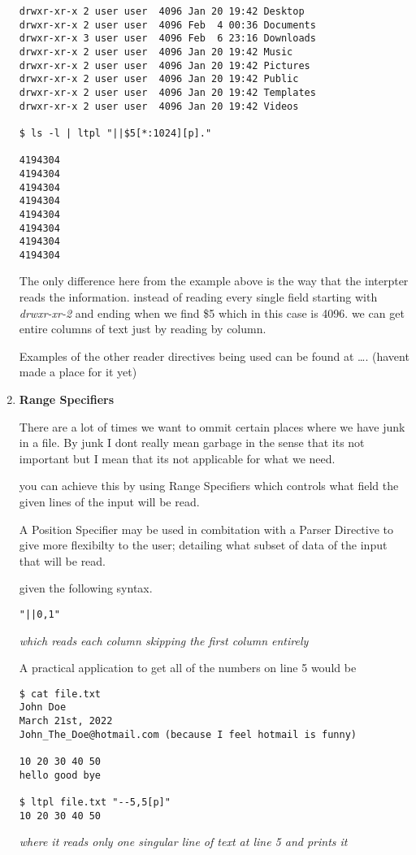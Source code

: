 \documentclass[11pt]{article}
\begin{document}
\begin{enumerate}
\begin{verbatim}
drwxr-xr-x 2 user user  4096 Jan 20 19:42 Desktop 
drwxr-xr-x 2 user user  4096 Feb  4 00:36 Documents
drwxr-xr-x 3 user user  4096 Feb  6 23:16 Downloads
drwxr-xr-x 2 user user  4096 Jan 20 19:42 Music 
drwxr-xr-x 2 user user  4096 Jan 20 19:42 Pictures
drwxr-xr-x 2 user user  4096 Jan 20 19:42 Public 
drwxr-xr-x 2 user user  4096 Jan 20 19:42 Templates 
drwxr-xr-x 2 user user  4096 Jan 20 19:42 Videos

$ ls -l | ltpl "||$5[*:1024][p]."

4194304 
4194304 
4194304 
4194304 
4194304 
4194304
4194304
4194304 
\end{verbatim}
The only difference here from the example above is the way that the interpter reads the information.
instead of reading every single field starting with \emph{drwxr-xr-2} and ending when we find \$5 which in this case is 4096.
we can get entire columns of text just by reading by column.

Examples of the other reader directives being used can be found at \ldots{}. (havent made a place for it yet)

\item \textbf{Range Specifiers}
\label{sec:org9be2093}

There are a lot of times we want to ommit certain places where we have junk in a file. 
By junk I dont really mean garbage in the sense that its not important but I mean
that its not applicable for what we need.

you can achieve this by using Range Specifiers which controls what field the given lines of the input will be read.

A Position Specifier may be used in combitation with a Parser Directive to give more flexibilty to the user;
detailing what subset of data of the input that will be read.

given the following syntax.\\
\begin{verbatim}
"||0,1"
\end{verbatim}
\emph{which reads each column skipping the first column entirely}

A practical application to get all of the numbers on line 5 would be
\begin{verbatim}
$ cat file.txt
John Doe
March 21st, 2022
John_The_Doe@hotmail.com (because I feel hotmail is funny)

10 20 30 40 50
hello good bye

$ ltpl file.txt "--5,5[p]"
10 20 30 40 50
\end{verbatim}
\emph{where it reads only one singular line of text at line 5 and prints it}
\end{enumerate}
\end{document}
